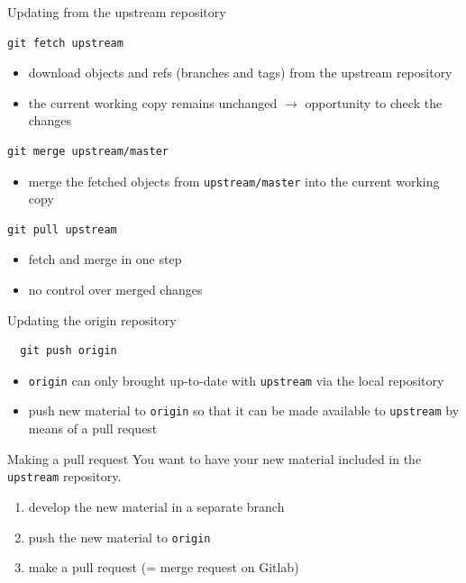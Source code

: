 \documentclass[svgnames]{beamer}
\begin{document}
\begin{frame}[fragile]{Updating from the upstream repository}
 \begin{lstlisting}
git fetch upstream
 \end{lstlisting}
 \begin{itemize}
  \item download objects and refs (branches and tags) from the upstream
         repository
  \item the current working copy remains unchanged $\rightarrow$ opportunity to check
      the changes
 \end{itemize}
 \begin{lstlisting}
git merge upstream/master
 \end{lstlisting}
 \begin{itemize}
  \item merge the fetched objects from \texttt{upstream/master} into the current
        working copy
 \end{itemize}

 \begin{lstlisting}
git pull upstream
 \end{lstlisting}
 \begin{itemize}
  \item fetch and merge in one step
  \item no control over merged changes
 \end{itemize}

\end{frame}

\begin{frame}[fragile]{Updating the origin repository}
 \begin{lstlisting}
  git push origin 
 \end{lstlisting}
 \begin{itemize}
  \item \texttt{origin} can only brought up-to-date with \texttt{upstream} via
      the local repository
  \item push new material to \texttt{origin} so that it can be made available
      to \texttt{upstream} by means of a pull request
 \end{itemize}
\end{frame}

\begin{frame}{Making a pull request}
  You want to have your new material included in the
 \texttt{upstream} repository.

 \begin{enumerate}
  \item develop the new material in a separate branch
  \item push the new material to \texttt{origin}
  \item make a pull request (= merge request on Gitlab)
 \end{enumerate}
\end{frame}
\end{document}
